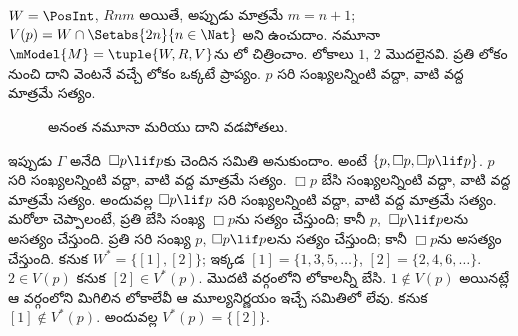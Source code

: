 \documentclass[../../../include/open-logic-section]{subfiles}
\begin{document}
\begin{ex}
  $W = \PosInt$, $Rnm$ అయితే, అప్పుడు మాత్రమే
  $m = n + 1$; $V(p) = W \cap \Setabs{2n}{n \in
    \Nat}$ అని ఉంచుదాం. నమూనా
  $\mModel{M} = \tuple{W, R, V}$ను
  లో చిత్రించాం. లోకాలు
  $1$, $2$ మొదలైనవి. ప్రతి లోకం నుంచి దాని వెంటనే వచ్చే
  లోకం ఒక్కటే ప్రాప్యం. $p$ సరి సంఖ్యలన్నింటి వద్దా,
  వాటి వద్ద మాత్రమే సత్యం.

  \begin{figure}
    \centering

    \caption{అనంత నమూనా మరియు దాని వడపోతలు.}
  \end{figure}

  ఇప్పుడు $\Gamma$ అనేది~$\Box p \lif p$కు చెందిన
   సమితి అనుకుందాం.
  అంటే $\{p, \Box p, \Box p \lif p\}$.
  $p$ సరి సంఖ్యలన్నింటి వద్దా, వాటి వద్ద మాత్రమే సత్యం.
  $\Box p$ బేసి సంఖ్యలన్నింటి వద్దా, వాటి వద్ద మాత్రమే సత్యం.
  అందువల్ల $\Box p \lif p$ సరి సంఖ్యలన్నింటి వద్దా,
  వాటి వద్ద మాత్రమే సత్యం.
  మరోలా చెప్పాలంటే, ప్రతి బేసి సంఖ్య $\Box p$ను
  సత్యం చేస్తుంది; కానీ $p$,~$\Box p \lif p$లను
  అసత్యం చేస్తుంది. ప్రతి సరి సంఖ్య $p$,
  $\Box p \lif p$లను సత్యం చేస్తుంది; కానీ
  $\Box p$ను అసత్యం చేస్తుంది. కనుక
  $W^* = \{ [1], [2] \}$; ఇక్కడ
  $[1] = \{1, 3, 5, \dots\}$,
  $[2] = \{2, 4, 6, \dots\}$. $2 \in V(p)$ కనుక
  $[2] \in V^*(p)$. మొదటి వర్గంలోని లోకాలన్నీ బేసి.
  $1 \notin V(p)$ అయినట్లే ఆ వర్గంలోని మిగిలిన లోకాలేవీ
  ఆ మూల్యనిర్ణయం ఇచ్చే సమితిలో లేవు. కనుక
  $[1] \notin V^*(p)$. అందువల్ల
  $V^*(p) = \{[2]\}$.


\end{ex}
\end{document}
